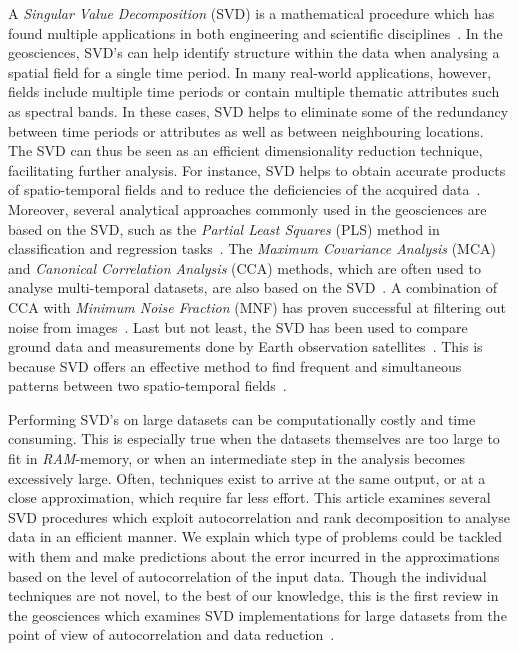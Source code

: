 \documentclass[ijgi,article,submit,moreauthors,pdftex,10pt,a4paper]{Definitions/mdpi}
\begin{document}
A \textit{Singular Value Decomposition} (SVD) is a mathematical procedure which has found multiple applications in both engineering and scientific disciplines~\cite{Rajwade13, khoshbin16, meuwissen17}. In the geosciences, SVD's can help identify structure within the data when analysing a spatial field for a single time period. In many real-world applications, however, fields include multiple time periods or contain multiple thematic attributes such as spectral bands. In these cases, SVD helps to eliminate some of the redundancy between time periods or attributes as well as between neighbouring locations. The SVD can thus be seen as an efficient dimensionality reduction technique, facilitating further analysis. For instance, SVD helps to obtain accurate products of spatio-temporal fields and to reduce the deficiencies of the acquired data~\cite{izquierdo17}. Moreover, several analytical approaches commonly used in the geosciences are based on the SVD, such as the \textit{Partial Least Squares} (PLS) method in classification and regression tasks~\cite{izquierdo14, hansen03}. The \textit{Maximum Covariance Analysis} (MCA) and \textit{Canonical Correlation Analysis} (CCA) methods, which are often used to analyse multi-temporal datasets, are also based on the SVD~\cite{munoz13}. A combination of CCA with \textit{Minimum Noise Fraction} (MNF) has proven successful at filtering out noise from images~\cite{nielsen07}. Last but not least, the SVD has been used to compare ground data and measurements done by Earth observation satellites~\cite{li14, li14b}. This is because SVD offers an effective method to find frequent and simultaneous patterns between two spatio-temporal fields~\cite{Eshel2011, Storch1999}.

Performing SVD's on large datasets can be computationally costly and time consuming. This is especially true when the datasets themselves are too large to fit in \textit{RAM}-memory, or when an intermediate step in the analysis becomes excessively large. Often, techniques exist to arrive at the same output, or at a close approximation, which require far less effort. This article examines several SVD procedures which exploit autocorrelation and rank decomposition to analyse data in an efficient manner. We explain which type of problems could be tackled with them and make predictions about the error incurred in the approximations based on the level of autocorrelation of the input data. Though the individual techniques are not novel, to the best of our knowledge, this is the first review in the geosciences which examines SVD implementations for large datasets from the point of view of autocorrelation and data reduction~\cite{Golub1970, Bjorck1973, Chan1982}.
\end{document}
